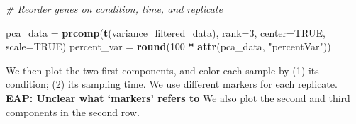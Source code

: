 \documentclass[9pt,a4paper,]{extarticle}
\newenvironment{Shaded}{\begin{snugshade}}{\end{snugshade}}
\newcommand{\CommentTok}[1]{\textcolor[rgb]{0.56,0.35,0.01}{\textit{#1}}}
\newcommand{\DataTypeTok}[1]{\textcolor[rgb]{0.13,0.29,0.53}{#1}}
\newcommand{\DecValTok}[1]{\textcolor[rgb]{0.00,0.00,0.81}{#1}}
\newcommand{\KeywordTok}[1]{\textcolor[rgb]{0.13,0.29,0.53}{\textbf{#1}}}
\newcommand{\NormalTok}[1]{#1}
\newcommand{\OperatorTok}[1]{\textcolor[rgb]{0.81,0.36,0.00}{\textbf{#1}}}
\newcommand{\OtherTok}[1]{\textcolor[rgb]{0.56,0.35,0.01}{#1}}
\newcommand{\StringTok}[1]{\textcolor[rgb]{0.31,0.60,0.02}{#1}}
\begin{document}
\begin{Shaded}
\begin{Highlighting}[]
\CommentTok{# Reorder genes on condition, time, and replicate}

\NormalTok{pca_data =}\StringTok{ }\KeywordTok{prcomp}\NormalTok{(}\KeywordTok{t}\NormalTok{(variance_filtered_data), }\DataTypeTok{rank=}\DecValTok{3}\NormalTok{, }\DataTypeTok{center=}\OtherTok{TRUE}\NormalTok{, }\DataTypeTok{scale=}\OtherTok{TRUE}\NormalTok{) }
\NormalTok{percent_var =}\StringTok{ }\KeywordTok{round}\NormalTok{(}\DecValTok{100} \OperatorTok{*}\StringTok{ }\KeywordTok{attr}\NormalTok{(pca_data, }\StringTok{"percentVar"}\NormalTok{))}
\end{Highlighting}
\end{Shaded}

We then plot the two first components, and color each sample by (1) its
condition; (2) its sampling time. We use different markers for each replicate. \textbf{EAP: Unclear what `markers' refers to}
We also plot the second and third components in the second row.
\end{document}
